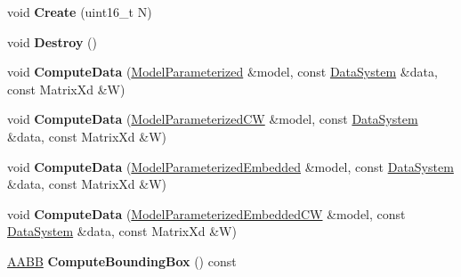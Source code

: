 \begin{DoxyCompactItemize}
\item 
\hypertarget{struct_d_r_d_s_p_1_1_reduced_data_system_a5161bf6e29b60d324025eb56a811217e}{void {\bfseries Create} (uint16\-\_\-t N)}\label{struct_d_r_d_s_p_1_1_reduced_data_system_a5161bf6e29b60d324025eb56a811217e}

\item 
\hypertarget{struct_d_r_d_s_p_1_1_reduced_data_system_ab1eafb140901723d22dc06ca95fb323e}{void {\bfseries Destroy} ()}\label{struct_d_r_d_s_p_1_1_reduced_data_system_ab1eafb140901723d22dc06ca95fb323e}

\item 
\hypertarget{struct_d_r_d_s_p_1_1_reduced_data_system_ae791e9522d7fb6d589c9e1f001eba314}{void {\bfseries Compute\-Data} (\hyperlink{struct_d_r_d_s_p_1_1_model_parameterized}{Model\-Parameterized} \&model, const \hyperlink{struct_d_r_d_s_p_1_1_data_system}{Data\-System} \&data, const Matrix\-Xd \&W)}\label{struct_d_r_d_s_p_1_1_reduced_data_system_ae791e9522d7fb6d589c9e1f001eba314}

\item 
\hypertarget{struct_d_r_d_s_p_1_1_reduced_data_system_a09565a90b382698cd1e24f9bb83c9115}{void {\bfseries Compute\-Data} (\hyperlink{struct_d_r_d_s_p_1_1_model_parameterized_c_w}{Model\-Parameterized\-C\-W} \&model, const \hyperlink{struct_d_r_d_s_p_1_1_data_system}{Data\-System} \&data, const Matrix\-Xd \&W)}\label{struct_d_r_d_s_p_1_1_reduced_data_system_a09565a90b382698cd1e24f9bb83c9115}

\item 
\hypertarget{struct_d_r_d_s_p_1_1_reduced_data_system_ad88bc475b0f2a10539ba5b079c63d28f}{void {\bfseries Compute\-Data} (\hyperlink{struct_d_r_d_s_p_1_1_model_parameterized_embedded}{Model\-Parameterized\-Embedded} \&model, const \hyperlink{struct_d_r_d_s_p_1_1_data_system}{Data\-System} \&data, const Matrix\-Xd \&W)}\label{struct_d_r_d_s_p_1_1_reduced_data_system_ad88bc475b0f2a10539ba5b079c63d28f}

\item 
\hypertarget{struct_d_r_d_s_p_1_1_reduced_data_system_a8a1973de2415d07ac2041b97fbe3e7aa}{void {\bfseries Compute\-Data} (\hyperlink{struct_d_r_d_s_p_1_1_model_parameterized_embedded_c_w}{Model\-Parameterized\-Embedded\-C\-W} \&model, const \hyperlink{struct_d_r_d_s_p_1_1_data_system}{Data\-System} \&data, const Matrix\-Xd \&W)}\label{struct_d_r_d_s_p_1_1_reduced_data_system_a8a1973de2415d07ac2041b97fbe3e7aa}

\item 
\hypertarget{struct_d_r_d_s_p_1_1_reduced_data_system_a21853627f8229be7b5ec278faa31257e}{\hyperlink{struct_d_r_d_s_p_1_1_a_a_b_b}{A\-A\-B\-B} {\bfseries Compute\-Bounding\-Box} () const }\label{struct_d_r_d_s_p_1_1_reduced_data_system_a21853627f8229be7b5ec278faa31257e}

\end{DoxyCompactItemize}
